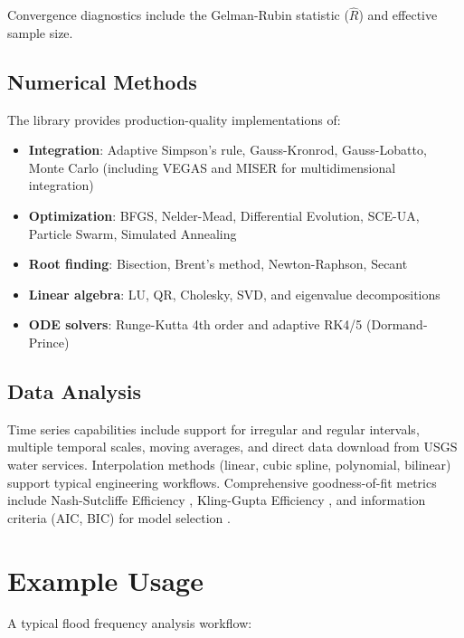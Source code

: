 \documentclass[10pt,a4paper,onecolumn]{article}
\begin{document}
Convergence diagnostics include the Gelman-Rubin statistic ($\hat{R}$) \citep{vehtari2021} and effective sample size.

\subsection*{Numerical Methods}

The library provides production-quality implementations of:

\begin{itemize}
    \item \textbf{Integration}: Adaptive Simpson's rule, Gauss-Kronrod, Gauss-Lobatto, Monte Carlo (including VEGAS and MISER for multidimensional integration)
    \item \textbf{Optimization}: BFGS, Nelder-Mead, Differential Evolution, SCE-UA, Particle Swarm, Simulated Annealing
    \item \textbf{Root finding}: Bisection, Brent's method, Newton-Raphson, Secant
    \item \textbf{Linear algebra}: LU, QR, Cholesky, SVD, and eigenvalue decompositions
    \item \textbf{ODE solvers}: Runge-Kutta 4th order and adaptive RK4/5 (Dormand-Prince)
\end{itemize}

\subsection*{Data Analysis}

Time series capabilities include support for irregular and regular intervals, multiple temporal scales, moving averages, and direct data download from USGS water services. Interpolation methods (linear, cubic spline, polynomial, bilinear) support typical engineering workflows. Comprehensive goodness-of-fit metrics include Nash-Sutcliffe Efficiency \citep{nash1970}, Kling-Gupta Efficiency \citep{gupta2009}, and information criteria (AIC, BIC) for model selection \citep{burnham2002}.

\section*{Example Usage}

A typical flood frequency analysis workflow:
\end{document}
